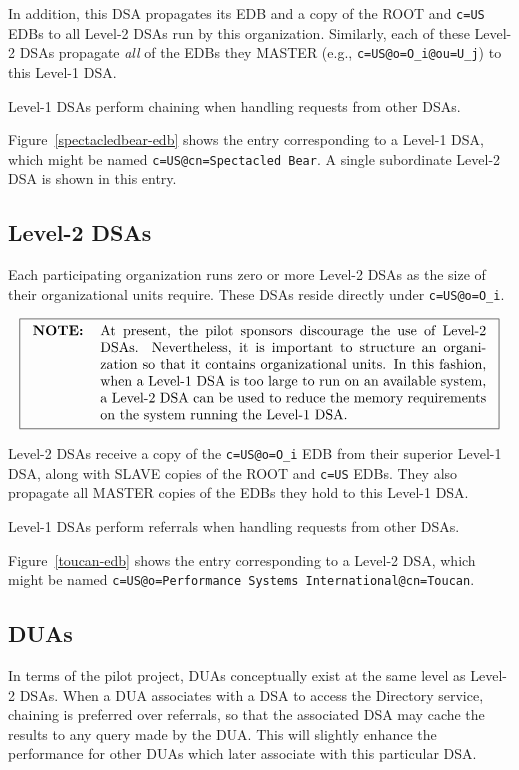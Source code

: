 In addition,
this DSA propagates its EDB and a copy of the ROOT and \verb"c=US" EDBs
to all Level-2 DSAs run by this organization.
Similarly,
each of these Level-2 DSAs propagate {\em all\/} of the EDBs they
MASTER (e.g., \verb"c=US@o=O_i@ou=U_j") to this Level-1 DSA.

Level-1 DSAs perform chaining when handling requests from other DSAs.

Figure~\ref{spectacledbear-edb} shows the entry corresponding to a Level-1 DSA,
which might be named \verb"c=US@cn=Spectacled Bear".
A single subordinate Level-2 DSA is shown in this entry.

\subsection	{Level-2 DSAs}
Each participating organization runs zero or more Level-2 DSAs as the size of
their organizational units require.
These DSAs reside directly under \verb"c=US@o=O_i".

\[\fbox{\begin{tabular}{lp{0.8\textwidth}}
\bf NOTE:&	At present, the pilot sponsors discourage the use of Level-2
		DSAs.

		Nevertheless,
		it is important to structure an organization so that it 
		contains organizational units.
		In this fashion,
		when a Level-1 DSA is too large to run on an available system,
		a Level-2 DSA can be used to reduce the memory requirements
		on the system running the Level-1 DSA.
\end{tabular}}\]

Level-2 DSAs receive a copy of the \verb"c=US@o=O_i" EDB from their
superior Level-1 DSA,
along with SLAVE copies of the ROOT and \verb"c=US" EDBs.
They also propagate all MASTER copies of the EDBs they hold to this Level-1
DSA. 

Level-1 DSAs perform referrals when handling requests from other DSAs.

Figure~\ref{toucan-edb} shows the entry corresponding to a Level-2 DSA,
which might be named \verb"c=US@o=Performance Systems International@cn=Toucan".

\subsection	{DUAs}
In terms of the pilot project,
DUAs conceptually exist at the same level as Level-2 DSAs.
When a DUA associates with a DSA to access the Directory service,
chaining is preferred over referrals,
so that the associated DSA may cache the results to any query made by the DUA.
This will slightly enhance the performance for other DUAs which later
associate with this particular DSA.

